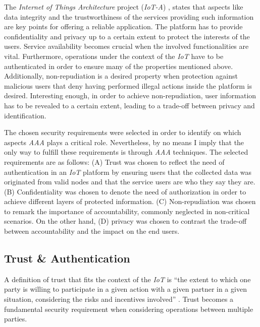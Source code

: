\documentclass[journal]{IEEEtran}
\begin{document}
  The \emph{Internet of Things Architecture} project (\emph{IoT-A}) \cite{Salinas2013}, states that aspects like data integrity and the trustworthiness of the services providing such information are key points for offering a reliable application. The platform has to provide confidentiality and privacy up to a certain extent to protect the interests of the users. Service availability becomes crucial when the involved functionalities are vital. Furthermore, operations under the context of the \emph{IoT} have to be authenticated in order to ensure many of the properties mentioned above. Additionally, non-repudiation is a desired property when protection against malicious users that deny having performed illegal actions inside the platform is desired. Interesting enough, in order to achieve non-repudiation, user information has to be revealed to a certain extent, leading to a trade-off between privacy and identification.

  The chosen security requirements were selected in order to identify on which aspects \emph{AAA} plays a critical role. Nevertheless, by no means I imply that the only way to fulfill these requirements is through \emph{AAA} techniques. The selected requirements are as follows: (A) Trust was chosen to reflect the need of authentication in an \emph{IoT} platform by ensuring users that the collected data was originated from valid nodes and that the service users are who they say they are. (B) Confidentiality was chosen to denote the need of authorization in order to achieve different layers of protected information. (C) Non-repudiation was chosen to remark the importance of accountability, commonly neglected in non-critical scenarios. On the other hand, (D) privacy was chosen to contrast the trade-off between accountability and the impact on the end users.

  \subsection{Trust \& Authentication}
  A definition of trust that fits the context of the \emph{IoT} is ``the extent to which one party is willing to participate in a given action with a given partner in a given situation, considering the risks and incentives involved'' \cite{Ruohomaa2006}. Trust becomes a fundamental security requirement when considering operations between multiple parties.
\end{document}
